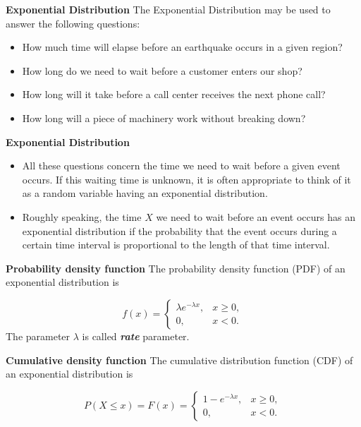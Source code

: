 \textbf{Exponential Distribution}
The Exponential Distribution may be used to answer the following questions:
\begin{itemize}
\item How much time will elapse before an earthquake occurs in a given region?
\item How long do we need to wait before a customer enters our shop?
\item How long will it take before a call center receives the next phone call?
\item How long will a piece of machinery work without breaking down?
\end{itemize}
\medskip


\textbf{Exponential Distribution}

\begin{itemize}
\item All these questions concern the time we need to wait before a given event occurs. If this waiting time is unknown, it is often appropriate to think of it as a random variable having an exponential distribution.
\item Roughly speaking, the time $X$ we need to wait before an event occurs has an exponential distribution if the probability that the event occurs during a certain time interval is proportional to the length of that time interval.

\end{itemize}
\medskip


\textbf{Probability density function}
The probability density function (PDF) of an exponential distribution is

\[
f(x) = \begin{cases}
\lambda e^{-\lambda x}, & x \ge 0, \\
0, & x < 0.
\end{cases}\]
The parameter $\lambda$  is called \textbf{\emph{rate}} parameter.
\medskip


\textbf{Cumulative density function}
The cumulative distribution function (CDF) of an exponential distribution is

\[
P(X \leq x) = F(x) = \begin{cases}
1-e^{-\lambda x}, & x \ge 0, \\
0, & x < 0.
\end{cases}\]


